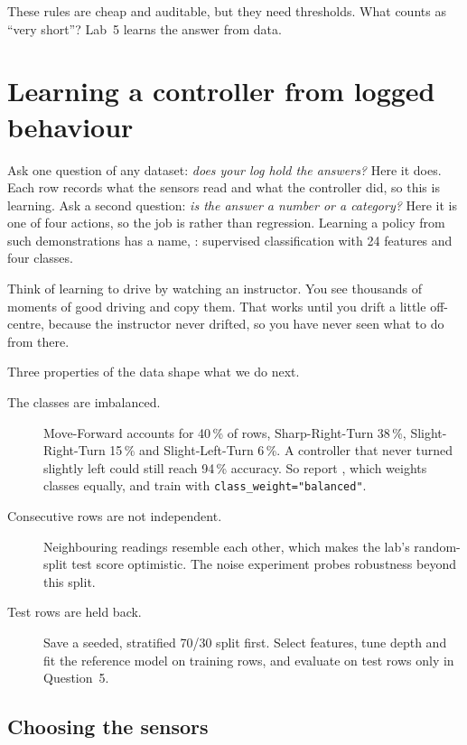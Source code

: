These rules are cheap and auditable, but they need thresholds. What counts as ``very short''? Lab~5 learns the answer from data.

\section{Learning a controller from logged behaviour}

Ask one question of any dataset: \emph{does your log hold the answers?} Here it does. Each row records what the sensors read and what the controller did, so this is  learning. Ask a second question: \emph{is the answer a number or a category?} Here it is one of four actions, so the job is  rather than regression. Learning a policy from such demonstrations has a name, : supervised classification with 24 features and four classes.

\begin{analogy}
Think of learning to drive by watching an instructor. You see thousands of moments of good driving and copy them. That works until you drift a little off-centre, because the instructor never drifted, so you have never seen what to do from there.
\end{analogy}

Three properties of the data shape what we do next.

\begin{description}
  \item[The classes are imbalanced.] Move-Forward accounts for 40\,\% of rows, Sharp-Right-Turn 38\,\%, Slight-Right-Turn 15\,\% and Slight-Left-Turn 6\,\%. A controller that never turned slightly left could still reach 94\,\% accuracy. So report , which weights classes equally, and train with \texttt{class\_weight="balanced"}.
  \item[Consecutive rows are not independent.] Neighbouring readings resemble each other, which makes the lab's random-split test score optimistic. The noise experiment probes robustness beyond this split.
  \item[Test rows are held back.] Save a seeded, stratified 70/30 split first. Select features, tune depth and fit the reference model on training rows, and evaluate on test rows only in Question~5.
\end{description}

\subsection{Choosing the sensors}

